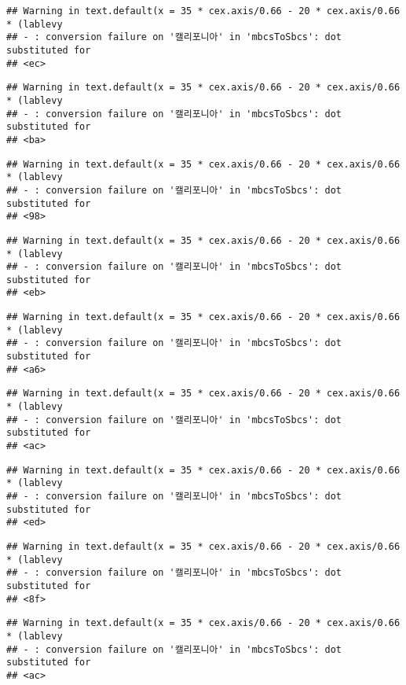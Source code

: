 \documentclass[
]{article}
\begin{document}
\begin{verbatim}
## Warning in text.default(x = 35 * cex.axis/0.66 - 20 * cex.axis/0.66 * (lablevy
## - : conversion failure on '캘리포니아' in 'mbcsToSbcs': dot substituted for
## <ec>
\end{verbatim}

\begin{verbatim}
## Warning in text.default(x = 35 * cex.axis/0.66 - 20 * cex.axis/0.66 * (lablevy
## - : conversion failure on '캘리포니아' in 'mbcsToSbcs': dot substituted for
## <ba>
\end{verbatim}

\begin{verbatim}
## Warning in text.default(x = 35 * cex.axis/0.66 - 20 * cex.axis/0.66 * (lablevy
## - : conversion failure on '캘리포니아' in 'mbcsToSbcs': dot substituted for
## <98>
\end{verbatim}

\begin{verbatim}
## Warning in text.default(x = 35 * cex.axis/0.66 - 20 * cex.axis/0.66 * (lablevy
## - : conversion failure on '캘리포니아' in 'mbcsToSbcs': dot substituted for
## <eb>
\end{verbatim}

\begin{verbatim}
## Warning in text.default(x = 35 * cex.axis/0.66 - 20 * cex.axis/0.66 * (lablevy
## - : conversion failure on '캘리포니아' in 'mbcsToSbcs': dot substituted for
## <a6>
\end{verbatim}

\begin{verbatim}
## Warning in text.default(x = 35 * cex.axis/0.66 - 20 * cex.axis/0.66 * (lablevy
## - : conversion failure on '캘리포니아' in 'mbcsToSbcs': dot substituted for
## <ac>
\end{verbatim}

\begin{verbatim}
## Warning in text.default(x = 35 * cex.axis/0.66 - 20 * cex.axis/0.66 * (lablevy
## - : conversion failure on '캘리포니아' in 'mbcsToSbcs': dot substituted for
## <ed>
\end{verbatim}

\begin{verbatim}
## Warning in text.default(x = 35 * cex.axis/0.66 - 20 * cex.axis/0.66 * (lablevy
## - : conversion failure on '캘리포니아' in 'mbcsToSbcs': dot substituted for
## <8f>
\end{verbatim}

\begin{verbatim}
## Warning in text.default(x = 35 * cex.axis/0.66 - 20 * cex.axis/0.66 * (lablevy
## - : conversion failure on '캘리포니아' in 'mbcsToSbcs': dot substituted for
## <ac>
\end{verbatim}
\end{document}
